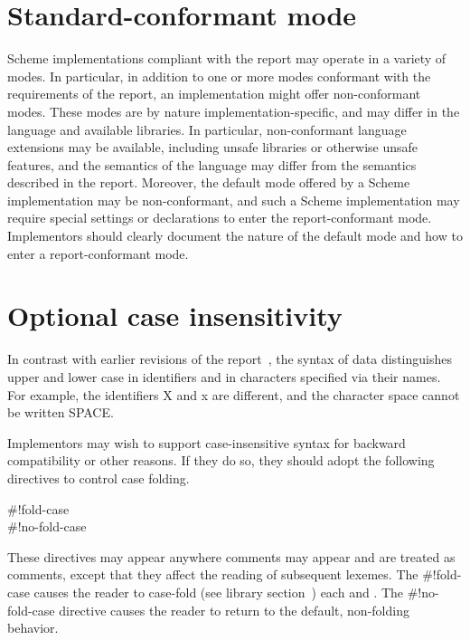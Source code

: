 \documentclass[twoside,twocolumn]{algol60}
\begin{document}
\vfill

\texonly\clearpage\endtexonly

\appendix

\chapter{Standard-conformant mode}
\label{standardconformantmode}

Scheme implementations compliant with the report may operate in a
variety of modes.  In particular, in addition to one or more modes
conformant with the requirements of the report, an implementation
might offer non-conformant modes.  These modes are by nature
implementation-specific, and may differ in the language and available
libraries.  In particular, non-conformant language extensions may be
available, including unsafe libraries or otherwise unsafe features,
and the semantics of the language may differ from the semantics
described in the report.  Moreover, the default mode offered by a
Scheme implementation may be non-conformant, and such a Scheme
implementation may require special settings or declarations to enter
the report-conformant mode.  Implementors should clearly
document the nature of the default mode and how to enter a
report-conformant mode.

\chapter{Optional case insensitivity}
\label{caseinsensitivityappendix}

In contrast with earlier revisions of the report~\cite{R5RS}, the
syntax of data distinguishes upper and lower case in identifiers and in
characters specified via their names.  For example, the identifiers
{\cf X} and {\cf x} are different, and the character
{\cf\sharpsign\backwhack{}space} cannot be written
{\cf\sharpsign\backwhack{}SPACE}.

Implementors may wish to support case-insensitive syntax for backward
compatibility or other reasons.
If they do so, they should adopt the following directives
to control case folding.

\begin{entry}{%
{\cf{}\#!fold-case}\\
{\cf{}\#!no-fold-case}}

These directives may appear anywhere comments may appear and are
treated as comments, except that they affect the reading of subsequent
lexemes.
The {\cf{}\#!fold-case} causes the reader to case-fold
(see library section~)
each  and .
The {\cf{}\#!no-fold-case} directive causes the reader to return
to the default, non-folding behavior.
\end{entry}
\end{document}
